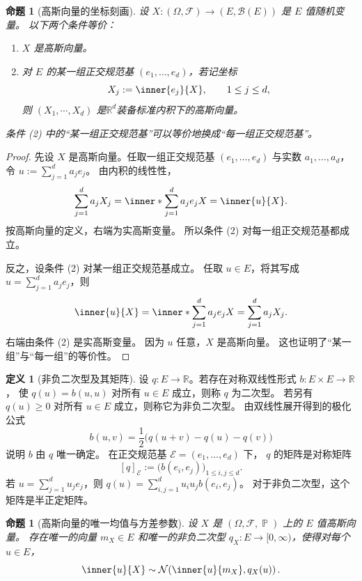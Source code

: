 \documentclass[UTF8,11pt,a4paper,oneside,fontset=fandol]{ctexrep}
\numberwithin{equation}{section}
\theoremstyle{plain}
\newtheorem{proposition}[theorem]{命题}
\theoremstyle{definition}
\newtheorem{definition}[theorem]{定义}
\theoremstyle{remark}
\newcommand{\R}{\mathbb{R}}
\newcommand{\B}{\mathcal{B}}
\newcommand{\F}{\mathcal{F}}
\DeclareMathOperator{\Prob}{\mathbb{P}}
\begin{document}
\begin{proposition}[高斯向量的坐标刻画]
\label{prop:gaussian-vector-coordinates}
设 $X:(\Omega,\F)\to(E,\B(E))$ 是 $E$ 值随机变量。
以下两个条件等价：
\begin{enumerate}[label=(\arabic*),leftmargin=2.6em]
  \item $X$ 是高斯向量。

  \item 对 $E$ 的某一组正交规范基 $(e_1,\ldots,e_d)$，若记坐标
  \[
    X_j:=\inner{e_j}{X},\qquad 1\le j\le d,
  \]
  则 $(X_1,\cdots,X_d)$ 是$\R^d$装备标准内积下的高斯向量。
\end{enumerate}
条件 (2) 中的“某一组正交规范基”可以等价地换成“每一组正交规范基”。
\end{proposition}

\begin{proof}
先设 $X$ 是高斯向量。任取一组正交规范基 $(e_1,\ldots,e_d)$
与实数 $a_1,\ldots,a_d$，令 $u:=\sum_{j=1}^{d}a_je_j$。
由内积的线性性，
\[
  \sum_{j=1}^{d}a_jX_j
  =\inner*{\sum_{j=1}^{d}a_je_j}{X}
  =\inner{u}{X}.
\]
按高斯向量的定义，右端为实高斯变量。
所以条件 (2) 对每一组正交规范基都成立。

反之，设条件 (2) 对某一组正交规范基成立。
任取 $u\in E$，将其写成 $u=\sum_{j=1}^{d}a_je_j$，则
\[
  \inner{u}{X}
  =\inner*{\sum_{j=1}^{d}a_je_j}{X}
  =\sum_{j=1}^{d}a_jX_j.
\]
右端由条件 (2) 是实高斯变量。
因为 $u$ 任意，$X$ 是高斯向量。
这也证明了“某一组”与“每一组”的等价性。
\end{proof}

\begin{definition}[非负二次型及其矩阵]
\label{def:nonnegative-quadratic-form}
设 $q:E\to\R$。若存在对称双线性形式 $b:E\times E\to\R$，
使 $q(u)=b(u,u)$ 对所有 $u\in E$ 成立，则称 $q$ 为二次型。
若另有 $q(u)\ge0$ 对所有 $u\in E$ 成立，则称它为非负二次型。
由双线性展开得到的极化公式
\[
  b(u,v)=\frac12\bigl(q(u+v)-q(u)-q(v)\bigr)
\]
说明 $b$ 由 $q$ 唯一确定。
在正交规范基 $\mathcal{E}=(e_1,\ldots,e_d)$ 下，
$q$ 的矩阵是对称矩阵
\[
  [q]_{\mathcal{E}}:=\bigl(b(e_i,e_j)\bigr)_{1\le i,j\le d}.
\]
若 $u=\sum_{j=1}^{d}u_je_j$，则
$q(u)=\sum_{i,j=1}^{d}u_i u_j b(e_i,e_j)$。
对于非负二次型，这个矩阵是半正定矩阵。
\end{definition}

\begin{proposition}[高斯向量的唯一均值与方差参数]
\label{prop:gaussian-vector-parameters}
设 $X$ 是 $(\Omega,\F,\Prob)$ 上的 $E$ 值高斯向量。
存在唯一的向量 $m_X\in E$ 和唯一的非负二次型
$q_X:E\to[0,\infty)$，使得对每个 $u\in E$，
\begin{equation}
  \label{eq:gaussian-vector-projection-law}
  \inner{u}{X}
  \sim\mathcal{N}\!\left(\inner{u}{m_X},q_X(u)\right).
\end{equation}
\end{proposition}
\end{document}

